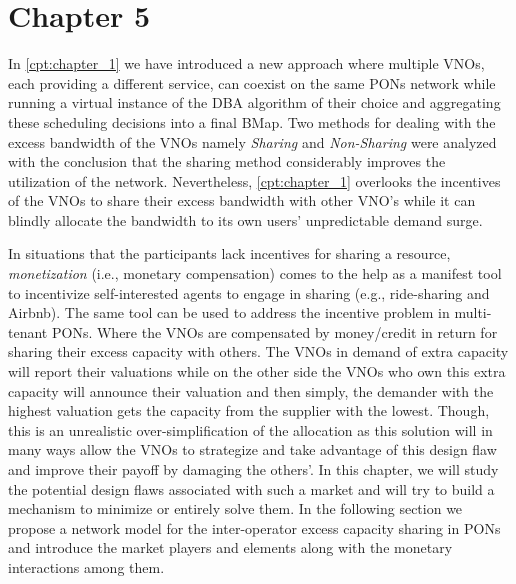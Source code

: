 \chapter*{Chapter 5}


In \autoref{cpt:chapter_1} we have introduced a new approach where multiple \acfp{VNO}, each providing a different service, can coexist on the same \acp{PON} network while running a virtual instance of the \ac{DBA} algorithm of their choice and aggregating these scheduling decisions into a final \ac{BMap}. Two methods for dealing with the excess bandwidth of the \acp{VNO} namely \textit{Sharing} and \textit{Non-Sharing} were analyzed with the conclusion that the sharing method considerably improves the utilization of the network. Nevertheless, \autoref{cpt:chapter_1} overlooks the incentives of the \acp{VNO} to share their excess bandwidth with other \ac{VNO}'s while it can blindly allocate the bandwidth to its own users' unpredictable demand surge.

In situations that the participants lack incentives for sharing a resource, \textit{monetization} (i.e., monetary compensation) comes to the help as a manifest tool to incentivize self-interested agents to engage in sharing (e.g., ride-sharing and Airbnb). The same tool can be used to address the incentive problem in multi-tenant \acp{PON}. Where the \acp{VNO} are compensated by money/credit in return for sharing their excess capacity with others. The \acp{VNO} in demand of extra capacity will report their valuations while on the other side the \acp{VNO} who own this extra capacity will announce their valuation and then simply, the demander with the highest valuation gets the capacity from the supplier with the lowest. Though, this is an unrealistic over-simplification of the allocation as this solution will in many ways allow the \acp{VNO} to strategize and take advantage of this design flaw and improve their payoff by damaging the others'. In this chapter, we will study the potential design flaws associated with such a market and will try to build a mechanism to minimize or entirely solve them. In the following section we propose a network model for the inter-operator excess capacity sharing in \acp{PON} and introduce the market players and elements along with the monetary interactions among them.


